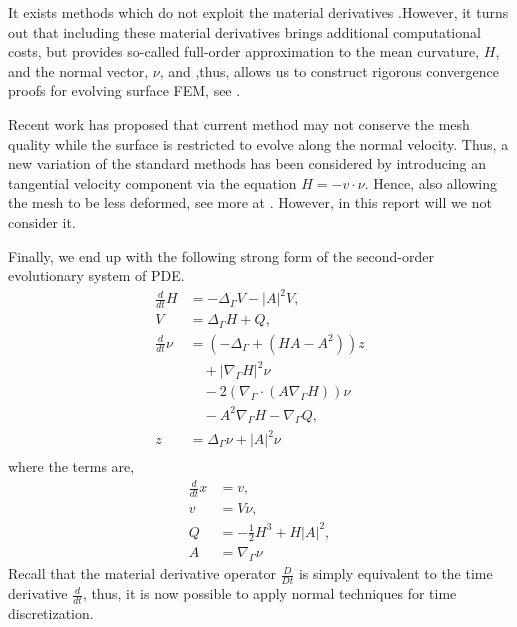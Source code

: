 It exists methods which do not exploit the material derivatives \cite{bonito2010parametric, bartezzaghi2016isogeometric}.However, it turns out that including these material derivatives brings additional computational costs, but provides so-called full-order
approximation to the mean curvature, $H$, and the normal vector, $\nu $, and ,thus, allows us to construct rigorous convergence proofs for evolving surface FEM, see \cite{kovacs2021convergent, binz2022convergent}.

Recent work has proposed that current method may not conserve the mesh quality while the surface is restricted to evolve along the normal velocity. Thus, a new variation of the standard methods has been considered by introducing an tangential
velocity component via the equation  $H = - v\cdot \nu  $. Hence, also allowing the mesh to be less deformed, see more at \cite{hu2022evolving}. However, in this report will we not consider it.

Finally, we end up with the following strong form of the second-order evolutionary system of PDE.
\begin{subequations}
    \label{eq:WE_strong_form}
    \begin{align}
\frac{d}{dt}H & = -  \Delta _{\Gamma }V - \left\lvert A \right\rvert ^2 V    , \\
V  & =   \Delta _{\Gamma } H + Q, \\
\frac{d}{dt} \nu & = \left( -\Delta _{\Gamma } + \left( HA - A^2 \right)  \right) z \nonumber \\
& \quad   + \left\lvert \nabla _{\Gamma } H \right\rvert ^2   \nu \nonumber  \\
 & \quad - 2\left( \nabla _{\Gamma }\cdot \left( A \nabla _{\Gamma } H \right)  \right) \nu \nonumber  \\
  & \quad  -A^2 \nabla _{\Gamma } H  - \nabla _{\Gamma } Q, \\
z & = \Delta  _{\Gamma } \nu  + \left\lvert A \right\rvert ^2 \nu \\
    \end{align}
\end{subequations}
where the terms are,
\[
    \begin{split}
\frac{d}{dt} x  &= v,\\
v & = V\nu, \\
Q & =  - \frac{1}{2} H^{3} + H \left\lvert A \right\rvert^2, \\
A & = \nabla _{\Gamma } \nu
    \end{split}
\]
Recall that the material derivative operator $\frac{D}{Dt} $ is simply equivalent to the time derivative $\frac{d}{dt}$, thus, it is now possible to apply normal techniques for time discretization.

